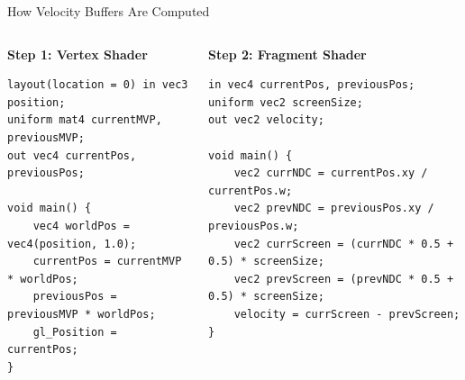 \documentclass[aspectratio=169]{beamer}
\begin{document}
\begin{frame}[fragile,shrink=2]{How Velocity Buffers Are Computed}
    
    \begin{columns}[t]
        \begin{column}{0.36\textwidth}  %
            \textbf{Step 1: Vertex Shader}
            \begin{lstlisting}[style=glslstyle, basicstyle=\tiny\ttfamily, numbers=none, backgroundcolor=\color{blue!8}, frame=single]
layout(location = 0) in vec3 position;
uniform mat4 currentMVP, previousMVP;
out vec4 currentPos, previousPos;

void main() {
    vec4 worldPos = vec4(position, 1.0);
    currentPos = currentMVP * worldPos;
    previousPos = previousMVP * worldPos;
    gl_Position = currentPos;
}
            \end{lstlisting}
        \end{column}
        
        \begin{column}{0.30\textwidth}  %
            \textbf{Step 2: Fragment Shader}
            \begin{lstlisting}[style=glslstyle, basicstyle=\tiny\ttfamily, numbers=none, backgroundcolor=\color{green!8}, frame=single]
in vec4 currentPos, previousPos;
uniform vec2 screenSize;  
out vec2 velocity;

void main() {
    vec2 currNDC = currentPos.xy / currentPos.w;
    vec2 prevNDC = previousPos.xy / previousPos.w;
    vec2 currScreen = (currNDC * 0.5 + 0.5) * screenSize;
    vec2 prevScreen = (prevNDC * 0.5 + 0.5) * screenSize;
    velocity = currScreen - prevScreen;
}
            \end{lstlisting}
        \end{column}
        

\end{columns}
\end{frame}
\end{document}
